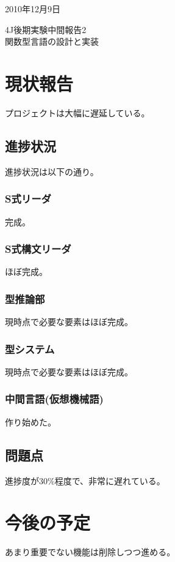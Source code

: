 \documentclass[a4paper, 10pt, oneside, notitlepage, onecolumn]{jsarticle}
\author{}
\begin{document}
\begin{flushright}
    2010年12月9日
\end{flushright}
\begin{center}
    4J後期実験中間報告2\\
\hspace{0.1em}
    \textsc{\LARGE 関数型言語の設計と実装}
\end{center}
\begin{flushright}
\end{flushright}
\section{現状報告}
プロジェクトは大幅に遅延している。

\subsection{進捗状況}
進捗状況は以下の通り。

\subsubsection{S式リーダ}
完成。

\subsubsection{S式構文リーダ}
ほぼ完成。

\subsubsection{型推論部}
現時点で必要な要素はほぼ完成。

\subsubsection{型システム}
現時点で必要な要素はほぼ完成。

\subsubsection{中間言語(仮想機械語)}
作り始めた。


\subsection{問題点}
進捗度が30\%程度で、非常に遅れている。

\section{今後の予定}
あまり重要でない機能は削除しつつ進める。
\end{document}
